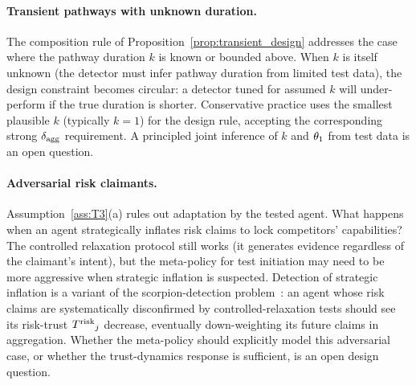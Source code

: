 \paragraph{Transient pathways with unknown duration.}
The composition rule of
Proposition~\ref{prop:transient_design} addresses the case where
the pathway duration $k$ is known or bounded above.  When $k$ is
itself unknown (the detector must infer pathway duration from
limited test data), the design constraint becomes circular: a
detector tuned for assumed $k$ will under-perform if the true
duration is shorter.  Conservative practice uses the smallest
plausible $k$ (typically $k = 1$) for the design rule, accepting
the corresponding strong $\delta_{\mathrm{agg}}$ requirement.  A principled
joint inference of $k$ and $\theta_1$ from test data is an open
question.

\paragraph{Adversarial risk claimants.}
Assumption~\ref{ass:T3}(a) rules out adaptation by the tested
agent.  What happens when an agent strategically inflates risk
claims to lock competitors' capabilities?  The controlled
relaxation protocol still works (it generates evidence
regardless of the claimant's intent), but the meta-policy for
test initiation may need to be more aggressive when strategic
inflation is suspected.  Detection of strategic inflation is a
variant of the scorpion-detection
problem~\citep[Propositions~3--4]{lasser2026scm}: an agent
whose risk claims are systematically disconfirmed by
controlled-relaxation tests should see its risk-trust
${T^{\mathrm{risk}}}_j$ decrease, eventually down-weighting its future
claims in aggregation.  Whether the meta-policy should
explicitly model this adversarial case, or whether the
trust-dynamics response is sufficient, is an open design
question.

